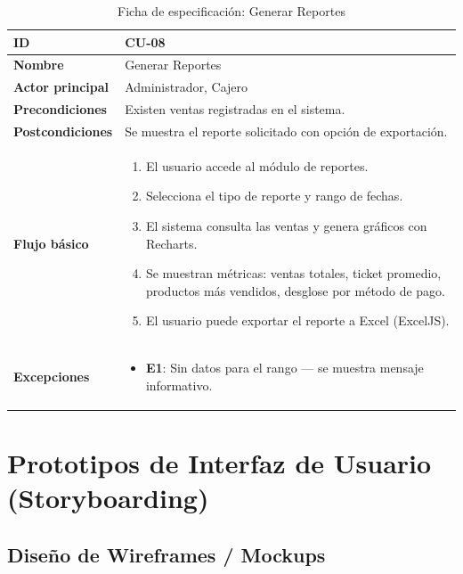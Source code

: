 \documentclass[12pt, a4paper]{article}
\begin{document}
\begin{table}[H]
\centering
\caption{Ficha de especificación: Generar Reportes}
\begin{tabularx}{\textwidth}{|l|X|}
    \hline
    \textbf{ID} & CU-08 \\ \hline
    \textbf{Nombre} & Generar Reportes \\ \hline
    \textbf{Actor principal} & Administrador, Cajero \\ \hline
    \textbf{Precondiciones} & Existen ventas registradas en el sistema. \\ \hline
    \textbf{Postcondiciones} & Se muestra el reporte solicitado con opción de exportación. \\ \hline
    \textbf{Flujo básico} &
    \begin{enumerate}[nosep, leftmargin=*]
        \item El usuario accede al módulo de reportes.
        \item Selecciona el tipo de reporte y rango de fechas.
        \item El sistema consulta las ventas y genera gráficos con Recharts.
        \item Se muestran métricas: ventas totales, ticket promedio, productos más vendidos, desglose por método de pago.
        \item El usuario puede exportar el reporte a Excel (ExcelJS).
    \end{enumerate} \\ \hline
    \textbf{Excepciones} &
    \begin{itemize}[nosep, leftmargin=*]
        \item \textbf{E1}: Sin datos para el rango --- se muestra mensaje informativo.
    \end{itemize} \\ \hline
\end{tabularx}
\end{table}

\section{Prototipos de Interfaz de Usuario (Storyboarding)}

\subsection{Diseño de Wireframes / Mockups}
\end{document}
